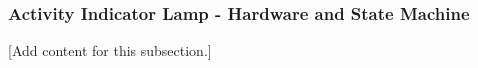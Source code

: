 
\subsubsection{Activity Indicator Lamp - Hardware and State Machine}
\label{subsubsec:design_8_3_activity_indicator}

[Add content for this subsection.]
